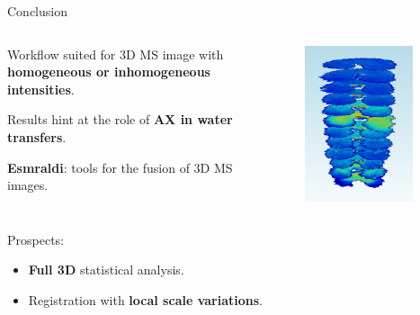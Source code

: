 \documentclass[10pt]{beamer}
\begin{document}
\begin{frame}{Conclusion}

  \begin{columns}
    \begin{column}{.8\textwidth}
      Workflow suited for 3D MS image with \textbf{homogeneous or inhomogeneous intensities}.

      Results hint at the role of \textbf{AX in water transfers}.

      \textbf{Esmraldi}: tools for the fusion of 3D MS images\footnotemark.
    \end{column}

    \begin{column}{.2\textwidth}
      \begin{figure}[ht]
        \centering
        \includegraphics[width=0.9\textwidth]{fig/3D_250DJ}
      \end{figure}

    \end{column}
  \end{columns}

 


  \vspace{0.4cm}

  Prospects:
  \begin{itemize}
  \item \textbf{Full 3D} statistical analysis.
  \item Registration with \textbf{local scale variations}.
  \end{itemize}



\end{frame}
\end{document}
